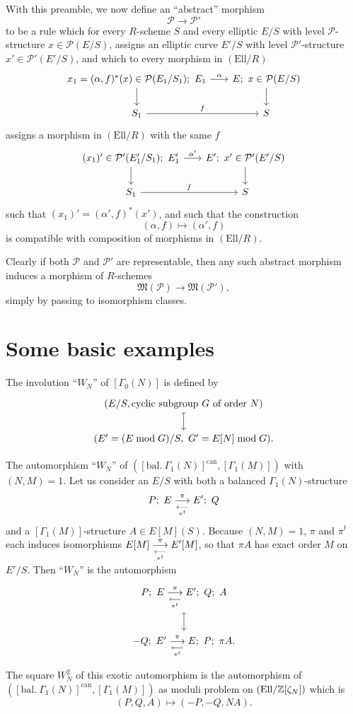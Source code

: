 \kmitem\label{item:11.2.1}
With this preamble, we now define an ``abstract'' morphism
\[
\mathcal{P} \to \mathcal{P}'
\]
to be a rule which for every $R$-scheme $S$ and every elliptic $E/S$ with level $\mathcal{P}$-structure $x \in \mathcal{P}(E/S)$, assigns an elliptic curve $E'/S$ with level $\mathcal{P}'$-structure $x' \in \mathcal{P}'(E'/S)$, and which to every morphism in $(\mathrm{Ell}/R)$
\[
\begin{tikzcd}[row sep=1.8em, column sep=1.8em]
x_1 = (\alpha, f)^*(x) \in \mathcal{P}(E_1/S_1);\ E_1 \arrow[r, "\alpha"] \arrow[d] & E;\ x \in \mathcal{P}(E/S) \arrow[d] \\
S_1 \arrow[r, "f"] & S
\end{tikzcd}
\]
assigns a morphism in $(\mathrm{Ell}/R)$ with the same $f$
\[
\begin{tikzcd}[row sep=1.8em, column sep=1.8em]
(x_1)' \in \mathcal{P}'(E_1'/S_1);\ E_1' \arrow[r, "\alpha'"] \arrow[d] & E';\ x' \in \mathcal{P}'(E'/S) \arrow[d] \\
S_1 \arrow[r, "f"] & S
\end{tikzcd}
\]
such that $(x_1)' = (\alpha', f)^*(x')$, and such that the construction
\[
(\alpha, f) \mapsto (\alpha', f)
\]
is compatible with composition of morphisms in $(\mathrm{Ell}/R)$.

Clearly if both $\mathcal{P}$ and $\mathcal{P}'$ are representable, then any such abstract morphism induces a morphism of $R$-schemes
\[
\mathfrak{M}(\mathcal{P}) \to \mathfrak{M}(\mathcal{P}') ,
\]
simply by passing to isomorphism classes.

\section{Some basic examples}
\label{sec:11.3}

\kmitem\label{item:11.3.1}
The involution ``$W_N$'' of $[\Gamma_0(N)]$ is defined by
\[
\begin{tikzcd}[row sep=1.8em]
(E/S, \text{cyclic subgroup } G \text{ of order } N) \arrow[d, mapsto] \\
(E' = (E \bmod G)/S,\ G' = E[N] \bmod G) .
\end{tikzcd}
\]

\kmitem\label{item:11.3.2}
The automorphism ``$W_N$'' of $([\mathrm{bal.}\ \Gamma_1(N)]^{\mathrm{can}}, [\Gamma_1(M)])$ with $(N,M) = 1$. Let us consider an $E/S$ with both a balanced $\Gamma_1(N)$-structure
\[
P;\ E \mathrel{ \mathop{\overset{\,\pi\,}{\longrightarrow}} \limits_{\underset{\,\pi^t\,}{\longleftarrow}} } E';\ Q
\]
and a $[\Gamma_1(M)]$-structure $A \in E[M](S)$. Because $(N,M) = 1$, $\pi$ and $\pi^t$ each induces isomorphisms $E[M] \mathrel{ \mathop{\overset{\,\pi\,}{\longrightarrow}} \limits_{\underset{\,\pi^t\,}{\longleftarrow}} } E'[M]$, so that $\pi A$ has exact order $M$ on $E'/S$. Then ``$W_N$'' is the automorphism
\[
\begin{tikzcd}[row sep=1.8em]
P;\ E \kmdual{\pi}{\pi^t} E';\ Q;\ A \arrow[d, mapsto] \\
-Q;\ E' \kmdual{\pi}{\pi^t} E;\ P;\ \pi A .
\end{tikzcd}
\]
The square $W_N^2$ of this exotic automorphism is the automorphism of $([\mathrm{bal.}\ \Gamma_1(N)]^{\mathrm{can}}, [\Gamma_1(M)])$ as moduli problem on $(\mathrm{Ell}/\mathbb{Z}[\zeta_N])$ which is
\[
(P, Q, A) \mapsto (-P, -Q, NA) .
\]

